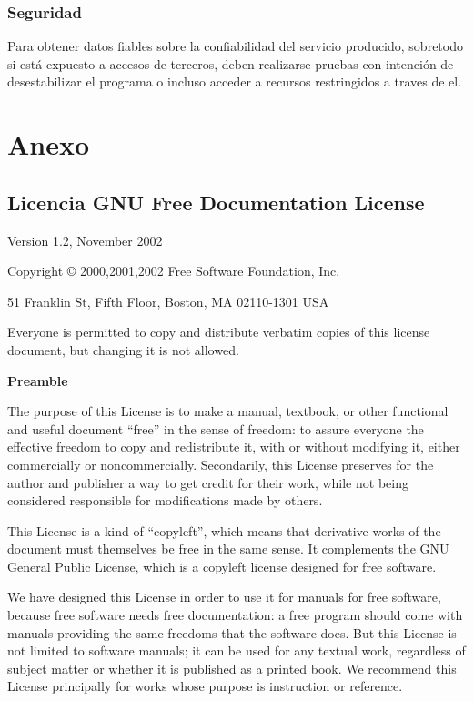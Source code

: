 \documentclass[a4paper,spanish,12pt]{book}
\begin{document}
\subsection{Seguridad}
Para obtener datos fiables sobre la confiabilidad del servicio producido, sobretodo si está expuesto a accesos de terceros, deben realizarse pruebas con intención de desestabilizar el programa o incluso acceder a recursos restringidos a traves de el.


\chapter{Anexo}
\section{Licencia GNU Free Documentation License}
 \begin{center}

       Version 1.2, November 2002


 Copyright \copyright{} 2000,2001,2002  Free Software Foundation, Inc.
 
 \bigskip
 
     51 Franklin St, Fifth Floor, Boston, MA  02110-1301  USA
  
 \bigskip
 
 Everyone is permitted to copy and distribute verbatim copies
 of this license document, but changing it is not allowed.
\end{center}


\begin{center}
{\bf\large Preamble}
\end{center}

The purpose of this License is to make a manual, textbook, or other
functional and useful document ``free'' in the sense of freedom: to
assure everyone the effective freedom to copy and redistribute it,
with or without modifying it, either commercially or noncommercially.
Secondarily, this License preserves for the author and publisher a way
to get credit for their work, while not being considered responsible
for modifications made by others.

This License is a kind of ``copyleft'', which means that derivative
works of the document must themselves be free in the same sense.  It
complements the GNU General Public License, which is a copyleft
license designed for free software.

We have designed this License in order to use it for manuals for free
software, because free software needs free documentation: a free
program should come with manuals providing the same freedoms that the
software does.  But this License is not limited to software manuals;
it can be used for any textual work, regardless of subject matter or
whether it is published as a printed book.  We recommend this License
principally for works whose purpose is instruction or reference.
\end{document}
